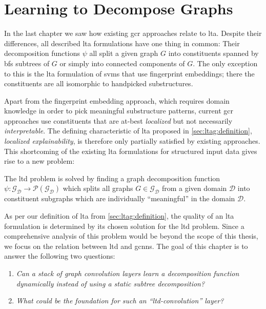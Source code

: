 \chapter{Learning to Decompose Graphs}%
\label{sec:ltd}

In the last chapter we saw how existing \ac{gcr} approaches relate to \ac{lta}.
Despite their differences, all described \ac{lta} formulations have one thing in common:
Their decomposition functions $\psi$ all split a given graph $G$ into constituents spanned by \ac{bfs} subtrees of $G$ or simply into connected components of $G$.
The only exception to this is the \ac{lta} formulation of \acp{svm} that use fingerprint embeddings; there the constituents are all isomorphic to handpicked substructures.

Apart from the fingerprint embedding approach, which requires domain knowledge in order to pick meaningful substructure patterns, current \ac{gcr} approaches use constituents that are at-best \textit{localized} but not necessarily \textit{interpretable}.
The defining characteristic of \ac{lta} proposed in \cref{sec:ltag:definition}, \textit{localized explainability}, is therefore only partially satisfied by existing approaches.
This shortcoming of the existing \ac{lta} formulations for structured input data gives rise to a new problem:
\begin{defn}
	The \ac{ltd} problem is solved by finding a graph decomposition function $\psi: \mathcal{G}_{\mathcal{D}} \to \mathcal{P}(\mathcal{G}_{\mathcal{D}})$ which splits all graphs $G \in \mathcal{G}_{\mathcal{D}}$ from a given domain $\mathcal{D}$ into constituent subgraphs which are individually ``meaningful'' in the domain $\mathcal{D}$.
\end{defn}

As per our definition of \ac{lta} from \cref{sec:ltag:definition}, the quality of an \ac{lta} formulation is determined by its chosen solution for the \ac{ltd} problem.
Since a comprehensive analysis of this problem would be beyond the scope of this thesis, we focus on the relation between \ac{ltd} and \acp{gcnn}.
The goal of this chapter is to answer the following two questions:
\begin{enumerate}
	\item \textit{Can a stack of graph convolution layers learn a decomposition function dynamically instead of using a static subtree decomposition?}
	\item \textit{What could be the foundation for such an ``\acs{ltd}-convolution'' layer?}
\end{enumerate}

